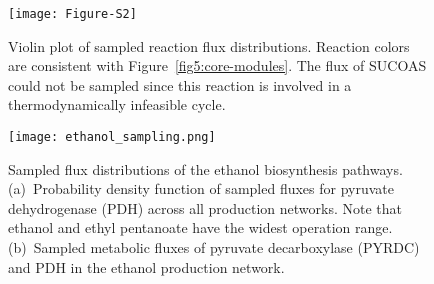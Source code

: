 \begin{figure}[!hp]
    \centering
    \texttt{[image: Figure-S2]}
    \caption[Violin plot of sampled reaction flux distributions]{
Violin plot of sampled reaction flux distributions. Reaction colors are consistent with Figure~\ref{fig5:core-modules}. The flux of SUCOAS could not be sampled since this reaction is involved in a thermodynamically infeasible cycle.
    }
    \label{fig5:fig-s2}
\end{figure}

\begin{figure}[!ht]
    \centering
    \texttt{[image: ethanol\_sampling.png]}
    \caption[Sampled flux distributions of the ethanol biosynthesis pathways]{Sampled flux distributions of the ethanol biosynthesis pathways. (a)~Probability density function of sampled fluxes for pyruvate dehydrogenase (PDH) across all production networks. Note that ethanol and ethyl pentanoate have the widest operation range. (b)~Sampled metabolic fluxes of pyruvate decarboxylase (PYRDC) and PDH in the ethanol production network.}
    \label{fig5:sampling}
\end{figure}%


